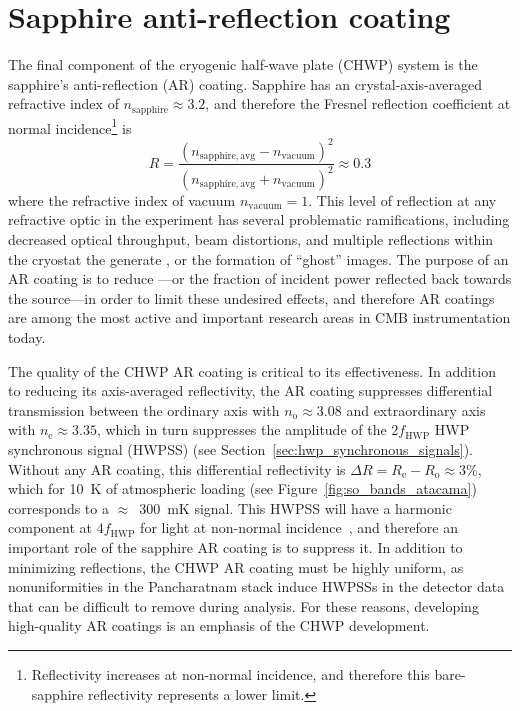 \chapter[Sapphire AR coating]{Sapphire anti-reflection coating}
\label{ch:sapphire_ar_coating}

The final component of the cryogenic half-wave plate (CHWP) system is the sapphire's anti-reflection (AR) coating. Sapphire has an crystal-axis-averaged refractive index of $n_{\mathrm{sapphire}} \approx 3.2$, and therefore the Fresnel reflection coefficient at normal incidence\footnote{Reflectivity increases at non-normal incidence, and therefore this bare-sapphire reflectivity represents a lower limit.} is
\begin{equation}
    R = \frac{\left( n_{\mathrm{sapphire, avg}} - n_{\mathrm{vacuum}} \right)^{2}}{\left( n_{\mathrm{sapphire, avg}} + n_{\mathrm{vacuum}} \right)^{2}} \approx 0.3
    \label{eq:sapphire_reflection_coefficient}
\end{equation}
where the refractive index of vacuum $n_{\mathrm{vacuum}} = 1$. This level of reflection at any refractive optic in the experiment has several problematic ramifications, including decreased optical throughput, beam distortions, and multiple reflections within the cryostat the generate , or the formation of ``ghost'' images. The purpose of an AR coating is to reduce ---or the fraction of incident power reflected back towards the source---in order to limit these undesired effects, and therefore AR coatings are among the most active and important research areas in CMB instrumentation today. 

The quality of the CHWP AR coating is critical to its effectiveness. In addition to reducing its axis-averaged reflectivity, the AR coating suppresses differential transmission between the ordinary axis with $n_{\mathrm{o}} \approx 3.08$ and extraordinary axis with $n_{\mathrm{e}} \approx 3.35$, which in turn suppresses the amplitude of the $2f_{\mathrm{HWP}}$ HWP synchronous signal (HWPSS) (see Section~\ref{sec:hwp_synchronous_signals}). Without any AR coating, this differential reflectivity is $\Delta R = R_{\mathrm{e}} - R_{\mathrm{o}} \approx 3$\%, which for 10~K of atmospheric loading (see Figure~\ref{fig:so_bands_atacama}) corresponds to a $\approx$~300~mK signal. This HWPSS will have a harmonic component at $4 f_{\mathrm{HWP}}$ for light at non-normal incidence~\cite{salatino_studies_2018}, and therefore an important role of the sapphire AR coating is to suppress it. In addition to minimizing reflections, the CHWP AR coating must be highly uniform, as nonuniformities in the Pancharatnam stack induce HWPSSs in the detector data that can be difficult to remove during analysis. For these reasons, developing high-quality AR coatings is an emphasis of the CHWP development.

